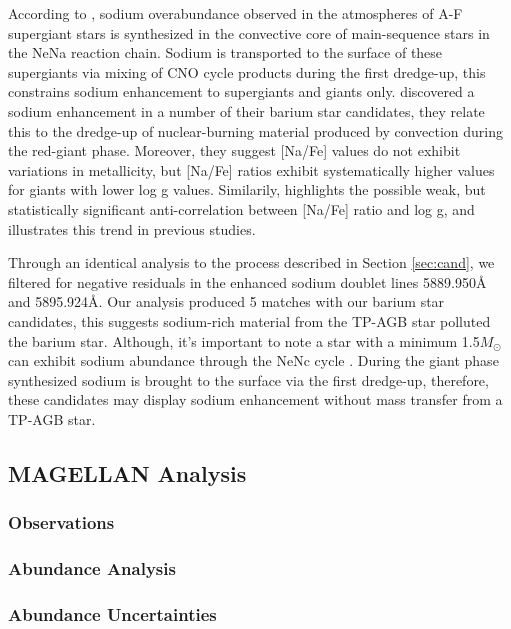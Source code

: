 \documentclass[a4paper,fleqn,usenatbib]{mnras}
\begin{document}
According to \citet{el1995}, sodium overabundance observed in the atmospheres of A-F supergiant stars is synthesized in the convective core of main-sequence stars in the NeNa reaction chain. Sodium is transported to the surface of these supergiants via mixing of CNO cycle products during the first dredge-up, this constrains sodium enhancement to supergiants and giants only. \citet{antipova2004} discovered a sodium enhancement in a number of their barium star candidates, they relate this to the dredge-up of nuclear-burning material produced by convection during the red-giant phase. Moreover, they suggest [Na/Fe] values do not exhibit variations in metallicity, but [Na/Fe] ratios exhibit systematically higher values for giants with lower log g values. Similarily, \citet{decastro2016} highlights the possible weak, but statistically significant anti-correlation between [Na/Fe] ratio and log g, and illustrates this trend in previous studies\citep[e.g.][]{boyarchuk2002,mishenina2006,luck2007,takeda2008}. 

Through an identical analysis to the process described in Section \ref{sec:cand}, we filtered for negative residuals in the enhanced sodium doublet lines 5889.950\AA\hspace{0.2mm} and 5895.924\AA. Our analysis produced 5 matches with our barium star candidates, this suggests sodium-rich material from the TP-AGB star polluted the barium star. Although, it's important to note a star with a minimum 1.5$M_\odot$ can exhibit sodium abundance through the NeNc cycle \citep{denissenkov1987}. During the giant phase synthesized sodium is brought to the surface via the first dredge-up, therefore, these candidates may display sodium enhancement without mass transfer from a TP-AGB star.

\subsection{MAGELLAN Analysis}

\subsubsection{Observations}

\subsubsection{Abundance Analysis}

\subsubsection{Abundance Uncertainties}
\end{document}
